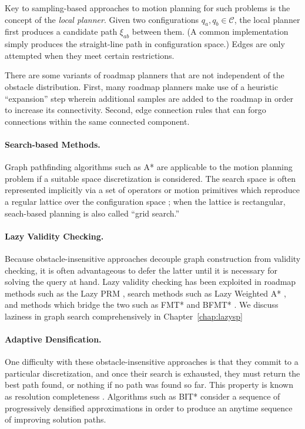 Key to sampling-based approaches
to motion planning for such problems
is the concept of the \emph{local planner}.
Given two configurations $q_a, q_b \in \mathcal{C}$,
the local planner first produces a candidate path $\xi_{ab}$ between
them.
(A common implementation simply produces the straight-line path
in configuration space.)
Edges are only attempted when they meet certain restrictions.

There are some variants of roadmap planners that are not independent
of the obstacle distribution.
First,
many roadmap planners make use of a heuristic ``expansion'' step
wherein additional samples are added to the roadmap
in order to increase its connectivity.
Second,
edge connection rules that can forgo connections within
the same connected component.


\paragraph{Search-based Methods.}
Graph pathfinding algorithms such as A* \citep{hart1968astar}
are applicable to the motion planning problem if a suitable
space discretization is considered.
The search space is often represented implicitly via a set of
operators or motion primitives
which reproduce a regular lattice over the configuration space
\citep{pivtoraiko2005statelattice};
when the lattice is rectangular,
seach-based planning is also called ``grid search.''

\paragraph{Lazy Validity Checking.}
Because obstacle-insensitive approaches decouple graph construction
from validity checking,
it is often advantageous to defer the latter until it is
necessary for solving the query at hand.
Lazy validity checking has been exploited
in roadmap methods such as the Lazy PRM
\citep{bohlin2000lazyprm, hauser2015lazy},
search methods such as Lazy Weighted A* \citep{cohen2014narms},
and methods which bridge the two such as FMT* \citep{janson2015fmtstar}
and BFMT* \citep{starek2015bfmtstar}.
We discuss laziness in graph search comprehensively
in Chapter~\ref{chap:lazysp}

\paragraph{Adaptive Densification.}
One difficulty with these obstacle-insensitive approaches
is that they commit to a particular discretization,
and once their search is exhausted,
they must return the best path found,
or nothing if no path was found so far.
This property is known as resolution completeness
\citep{cheng2004rescomplete}.
Algorithms such as BIT* \citep{gammell2015bitstar}
consider a sequence of progressively densified approximations
in order to produce an anytime sequence of improving solution paths.

